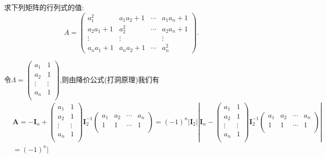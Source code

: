 \documentclass[lang=cn,newtx,10pt,scheme=chinese]{elegantbook}
\begin{document}
\begin{example}\label{example:1895}
求下列矩阵的行列式的值:
\[
A = 
\begin{pmatrix}
a_1^2 & a_1a_2 + 1 & \cdots & a_1a_n + 1\\
a_2a_1 + 1 & a_2^2 & \cdots & a_2a_n + 1\\
\vdots & \vdots & & \vdots\\
a_na_1 + 1 & a_na_2 + 1 & \cdots & a_n^2
\end{pmatrix}.
\]
\end{example}
\begin{solution}
令$\boldsymbol{\varLambda }=\left( \begin{matrix}
	a_1&		1\\
	a_2&		1\\
	\vdots&		\vdots\\
	a_n&		1\\
\end{matrix} \right)$,则由降价公式(打洞原理)我们有
\begin{align*}
    &\boldsymbol{A}=-\boldsymbol{I}_n+\left( \begin{matrix}
        a_1&		1\\
        a_2&		1\\
        \vdots&		\vdots\\
        a_n&		1\\
    \end{matrix} \right) \boldsymbol{I}_{2}^{-1}\left( \begin{matrix}
        a_1&		a_2&		\cdots&		a_n\\
        1&		1&		\cdots&		1\\
    \end{matrix} \right) =\left( -1 \right) ^n\left| \boldsymbol{I}_2 \right|\left| \boldsymbol{I}_n-\left( \begin{matrix}
        a_1&		1\\
        a_2&		1\\
        \vdots&		\vdots\\
        a_n&		1\\
    \end{matrix} \right) \boldsymbol{I}_{2}^{-1}\left( \begin{matrix}
        a_1&		a_2&		\cdots&		a_n\\
        1&		1&		\cdots&		1\\
    \end{matrix} \right) \right|
    \\
    &=\left( -1 \right) ^n\left| \begin{matrix}

\end{matrix}
\end{align*}
\end{solution}
\end{document}
